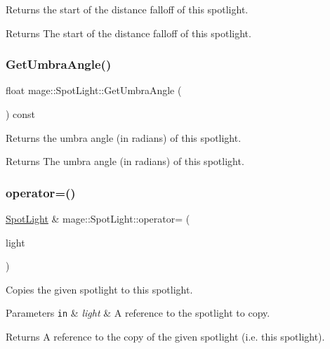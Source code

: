 Returns the start of the distance falloff of this spotlight.

\begin{DoxyReturn}{Returns}
The start of the distance falloff of this spotlight. 
\end{DoxyReturn}
\hypertarget{classmage_1_1_spot_light_a61d921afd94fbbf040cdb697d89c1a94}{}\label{classmage_1_1_spot_light_a61d921afd94fbbf040cdb697d89c1a94} 
\subsubsection{\texorpdfstring{Get\+Umbra\+Angle()}{GetUmbraAngle()}}
{\footnotesize\ttfamily float mage\+::\+Spot\+Light\+::\+Get\+Umbra\+Angle (\begin{DoxyParamCaption}{ }\end{DoxyParamCaption}) const\hspace{0.3cm}{\ttfamily [noexcept]}}

Returns the umbra angle (in radians) of this spotlight.

\begin{DoxyReturn}{Returns}
The umbra angle (in radians) of this spotlight. 
\end{DoxyReturn}
\hypertarget{classmage_1_1_spot_light_a04a23d643186a58fb3a03d0a73a63e39}{}\label{classmage_1_1_spot_light_a04a23d643186a58fb3a03d0a73a63e39} 
\subsubsection{\texorpdfstring{operator=()}{operator=()}\hspace{0.1cm}{\footnotesize\ttfamily [1/2]}}
{\footnotesize\ttfamily \hyperlink{classmage_1_1_spot_light}{Spot\+Light} \& mage\+::\+Spot\+Light\+::operator= (\begin{DoxyParamCaption}\item[{const \hyperlink{classmage_1_1_spot_light}{Spot\+Light} \&}]{light }\end{DoxyParamCaption})\hspace{0.3cm}{\ttfamily [default]}}

Copies the given spotlight to this spotlight.


\begin{DoxyParams}[1]{Parameters}
\mbox{\tt in}  & {\em light} & A reference to the spotlight to copy. \\
\hline
\end{DoxyParams}
\begin{DoxyReturn}{Returns}
A reference to the copy of the given spotlight (i.\+e. this spotlight). 
\end{DoxyReturn}
\hypertarget{classmage_1_1_spot_light_ab79e4bf1c488c1a753f434a4d84567e5}{}\label{classmage_1_1_spot_light_ab79e4bf1c488c1a753f434a4d84567e5} 
